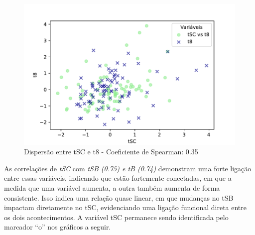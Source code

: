 \begin{figure}[h]
\begin{minipage}[b]{0.45\linewidth}
        \caption{Dispersão entre tSC e t8 - Coeficiente de Spearman: 0.35}
        \label{fig:tSC-t8}
        \centering
        \includegraphics[scale=0.35]{figuras/Spearman/tSC-t8.pdf}
        \vspace{0.3cm}
        \begin{minipage}{\linewidth}
            \centering
        \end{minipage}
    \end{minipage}
\end{figure}
\FloatBarrier

As correlações de \textit{tSC} com \textit{tSB (0.75) e tB (0.74)} demonstram uma forte ligação entre essas variáveis, indicando que estão fortemente conectadas, em que a medida que uma variável aumenta, a outra também aumenta de forma consistente. Isso indica uma relação quase linear, em que mudanças no tSB impactam diretamente no tSC, evidenciando uma ligação funcional direta entre os dois acontecimentos. A variável tSC permanece sendo identificada pelo marcador “o” nos gráficos a seguir.

